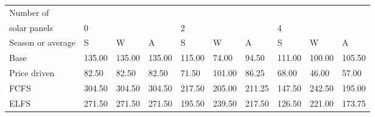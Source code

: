 \begin{table}[h] 
\centering 
\begin{tabular}{l|lll|lll|lll}Number of \\ solar panels&0& & &2& & &4& & \\ \hline 
Season or average & S & W & A & S & W & A & S & W & A \\ \hline 
Base&135.00&135.00&135.00&115.00&74.00&94.50&111.00&100.00&105.50 \\ 
Price driven&82.50&82.50&82.50&71.50&101.00&86.25&68.00&46.00&57.00 \\ 
FCFS&304.50&304.50&304.50&217.50&205.00&211.25&147.50&242.50&195.00 \\ 
ELFS&271.50&271.50&271.50&195.50&239.50&217.50&126.50&221.00&173.75 \\ 
\end{tabular} 
\end{table}